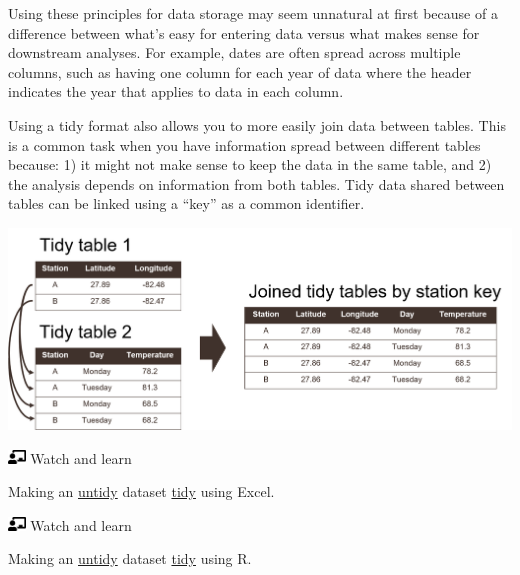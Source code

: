 \documentclass[
  letterpaper,
  DIV=11,
  numbers=noendperiod]{scrreprt}
\begin{document}
Using these principles for data storage may seem unnatural at first
because of a difference between what's easy for entering data versus
what makes sense for downstream analyses. For example, dates are often
spread across multiple columns, such as having one column for each year
of data where the header indicates the year that applies to data in each
column.

Using a tidy format also allows you to more easily join data between
tables. This is a common task when you have information spread between
different tables because: 1) it might not make sense to keep the data in
the same table, and 2) the analysis depends on information from both
tables. Tidy data shared between tables can be linked using a ``key'' as
a common identifier.

\includegraphics[width=6.26in,height=\textheight]{./img/joins.png}

\includegraphics[width=1.25em,height=1em]{./impact_files/figure-pdf/fa-icon-5a0e5cd7bfbf585f8546c1ff4cebae73.pdf}
Watch and learn

Making an
\href{https://github.com/tbep-tech/cerf-os-workshop/raw/master/data/untidy.xlsx}{untidy}
dataset
\href{https://github.com/tbep-tech/cerf-os-workshop/raw/master/data/tidy.xlsx}{tidy}
using Excel.

\includegraphics[width=1.25em,height=1em]{./impact_files/figure-pdf/fa-icon-5a0e5cd7bfbf585f8546c1ff4cebae73.pdf}
Watch and learn

Making an
\href{https://github.com/tbep-tech/cerf-os-workshop/raw/master/data/untidy.xlsx}{untidy}
dataset
\href{https://github.com/tbep-tech/cerf-os-workshop/raw/master/data/tidy.xlsx}{tidy}
using R.
\end{document}
